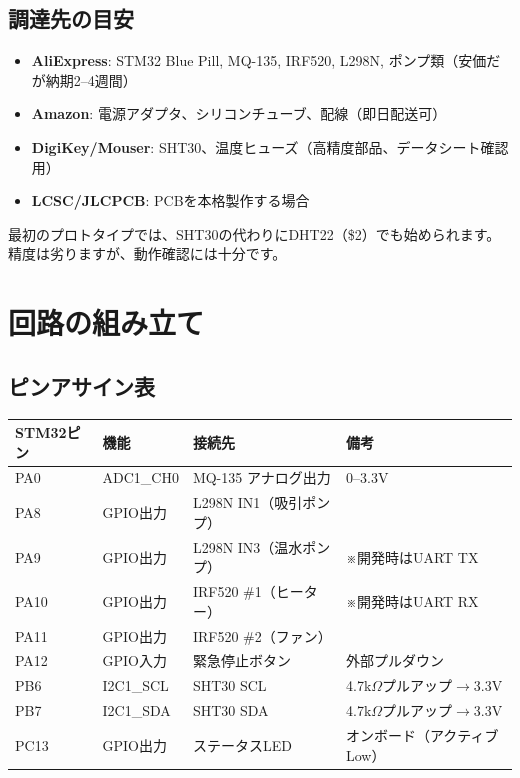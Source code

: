 \documentclass[a4paper,11pt]{article}
\begin{document}
\subsection{調達先の目安}

\begin{itemize}[leftmargin=2em]
  \item \textbf{AliExpress}: STM32 Blue Pill, MQ-135, IRF520, L298N, ポンプ類（安価だが納期2--4週間）
  \item \textbf{Amazon}: 電源アダプタ、シリコンチューブ、配線（即日配送可）
  \item \textbf{DigiKey/Mouser}: SHT30、温度ヒューズ（高精度部品、データシート確認用）
  \item \textbf{LCSC/JLCPCB}: PCBを本格製作する場合
\end{itemize}

\begin{tipbox}
最初のプロトタイプでは、SHT30の代わりにDHT22（\$2）でも始められます。精度は劣りますが、動作確認には十分です。
\end{tipbox}

\newpage
\section{回路の組み立て}

\subsection{ピンアサイン表}

\begin{longtable}{@{}llll@{}}
\toprule
\textbf{STM32ピン} & \textbf{機能} & \textbf{接続先} & \textbf{備考} \\
\midrule
\endhead
PA0  & ADC1\_CH0   & MQ-135 アナログ出力 & 0--3.3V \\
PA8  & GPIO出力    & L298N IN1（吸引ポンプ） & \\
PA9  & GPIO出力    & L298N IN3（温水ポンプ） & ※開発時はUART TX \\
PA10 & GPIO出力    & IRF520 \#1（ヒーター）  & ※開発時はUART RX \\
PA11 & GPIO出力    & IRF520 \#2（ファン）    & \\
PA12 & GPIO入力    & 緊急停止ボタン          & 外部プルダウン \\
PB6  & I2C1\_SCL   & SHT30 SCL & 4.7k$\Omega$プルアップ$\to$3.3V \\
PB7  & I2C1\_SDA   & SHT30 SDA & 4.7k$\Omega$プルアップ$\to$3.3V \\
PC13 & GPIO出力    & ステータスLED & オンボード（アクティブLow） \\
\bottomrule
\end{longtable}
\end{document}

